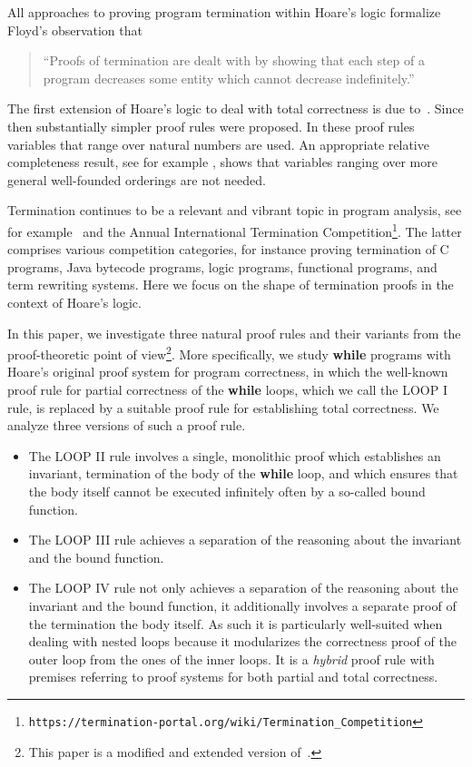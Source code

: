 \documentclass[manuscript, screen, review]{acmart}
\begin{document}
All approaches to proving program termination within Hoare’s logic formalize 
Floyd’s \cite{Flo67a} observation that
    \begin{quote}
    ``Proofs of termination are dealt with by showing that each step of a program 
      decreases some entity which cannot decrease indefinitely.”
    \end{quote}

The first extension of Hoare's logic
to deal with total correctness is due to~\cite{MP74}. 
Since then substantially simpler proof rules were proposed.
In these proof rules variables that range over natural numbers are used.
An appropriate relative completeness result, see for example \cite{ABO09}, 
shows that variables ranging over more general well-founded orderings 
are not needed.

Termination continues to be a relevant and vibrant topic in program
analysis, see for example~\cite{CookPR11} and the Annual International
Termination Competition\footnote{
\texttt{https://termination-portal.org/wiki/Termination\_Competition}}.
The latter comprises various competition categories, 
for instance proving termination of 
C programs, Java bytecode programs, logic programs,
functional programs, and term rewriting systems.
Here we focus on the shape of termination proofs in the context of
Hoare's logic. 

In this paper, we investigate three natural proof rules and their variants
from the proof-theoretic point of view\footnote{This paper 
 is a modified and extended version of~\cite{ABO25}.}.
More specifically, we study {\bf while} programs with Hoare's 
original proof system for program correctness, in which the well-known
proof rule for partial correctness of the {\bf while} loops, which we
call the LOOP I rule, is replaced by a suitable proof rule for
establishing total correctness.  We analyze three versions of such a
proof rule. 

\medskip

\begin{itemize}

\item The LOOP II rule involves a single, monolithic proof which
  establishes an invariant, termination of the body of the \textbf{while}
  loop, and which ensures that the body itself cannot be executed
  infinitely often by a so-called bound function.

\item The LOOP III rule achieves a separation of the reasoning about
  the invariant and the bound function.

\item The LOOP IV rule not only achieves a separation of the reasoning about
  the invariant and the bound function, it additionally involves
  a separate proof of the termination the body itself.
  As such it is particularly well-suited when dealing with nested loops
  because it modularizes the correctness proof of the outer loop from
  the ones of the inner loops. It is a \emph{hybrid} proof rule with
  premises referring to proof systems for both partial and total correctness.

\end{itemize}
\end{document}
